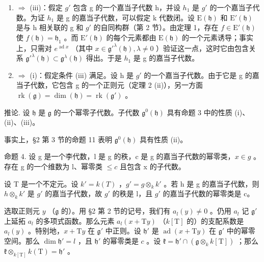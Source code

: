 \begin{enumerate}
\def\labelenumi{(\roman{enumi})}
\setcounter{enumi}{1}
\item
  \(\Longrightarrow\) (iii)：假定 \(g'\) 包含 g 的一个嘉当子代数 h，并设 \(h_{1}\) 是 \(g'\) 的一个嘉当子代数。为证 \(h_{1}\) 是 g 的嘉当子代数，可以假定 k 代数闭。设 \(\mathrm{E}(\mathfrak{h})\) 和 \(\mathrm{E}'(\mathfrak{h})\) 是与 h 相关联的 g 和 \(g'\) 的自同构群（第 2 节）。由定理 1，存在 \(f \in \mathrm{E}'(\mathfrak{h})\) 使 \(f(\mathfrak{h}) = \mathfrak{h}_{1}\) 。而 \(\mathrm{E}'(\mathfrak{h})\) 的每个元素都由 \(\mathrm{E}(\mathfrak{h})\) 的一个元素诱导；事实上，只需对 \(e^{\operatorname{ad} x}\) （其中 \(x \in \mathfrak{g}'^{\lambda}(\mathfrak{h}), \lambda \neq 0\) ）验证这一点，这时它由包含关系 \(\mathfrak{g}'^{\lambda}(\mathfrak{h}) \subset \mathfrak{g}^{\lambda}(\mathfrak{h})\) 得出。于是 \(h_{1}\) 是 g 的嘉当子代数。
\item
  \(\Longrightarrow\) (i)：假定条件 (iii) 满足。设 h 是 \(g'\) 的一个嘉当子代数。由于它是 g 的嘉当子代数，它包含 g 的一个正则元（定理 2 (ii)），另一方面 \(\operatorname{rk}(\mathfrak{g}) = \dim(\mathfrak{h}) = \operatorname{rk}(\mathfrak{g}')\) 。
\end{enumerate}

推论. 设 \(\mathfrak{h}\) 是 \(\mathfrak{g}\) 的一个幂零子代数。子代数 \(\mathfrak{g}^0 (\mathfrak{h})\) 具有命题 3 中的性质 (i)、(ii)、(iii)。

事实上，§2 第 3 节的命题 11 表明 \(\mathfrak{g}^0 (\mathfrak{h})\) 具有性质 (ii)。

命题 4. 设 g 是一个李代数，l 是 g 的秩，c 是 g 的嘉当子代数的幂零类，\(x \in g\) 。存在 g 的一个维数为 l、幂零类 \(\leq c\) 且包含 x 的子代数。

设 T 是一个不定元。设 \(k' = k(T)\) ，\(g' = g \otimes_k k'\) 。若 h 是 g 的嘉当子代数，则 \(h \otimes_k k'\) 是 \(g'\) 的嘉当子代数，故 \(g'\) 的秩是 l，且 \(g'\) 的嘉当子代数的幂零类是 c。

选取正则元 \(y\) （\(\mathfrak{g}\) 的）。用 §2 第 2 节的记号，我们有 \(a_l(y) \neq 0\) 。仍用 \(a_l\) 记 \(\mathfrak{g}'\) 上延拓 \(a_l\) 的多项式函数。那么元素 \(a_l(x + \mathrm{T}y)\) （\(k[\mathrm{T}]\) 的）的支配系数是 \(a_l(y)\) 。特别地，\(x + \mathrm{T}y\) 在 \(\mathfrak{g}'\) 中正则。设 \(\mathfrak{h}'\) 是 \(\operatorname{ad}(x + \mathrm{T}y)\) 在 \(\mathfrak{g}'\) 中的幂零空间。那么 \(\dim \mathfrak{h}' = l\) ，且 \(\mathfrak{h}'\) 的幂零类是 \(c\) 。设 \(\mathfrak{k} = \mathfrak{h}' \cap (\mathfrak{g} \otimes_k k[\mathrm{T}])\) ；那么 \(\mathfrak{k} \otimes_{k[\mathrm{T}]} k(\mathrm{T}) = \mathfrak{h}'\) 。

